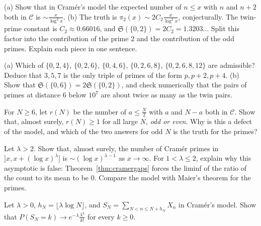 \begin{exercise}[$\star$]\label{ex:modeltwins}
(a) Show that in Cramér's model the expected number of $n\le x$ with $n$ and $n+2$ both in $\mathcal C$ is $\sim\frac x{\log^2x}$.
(b) The truth is $\pi_2(x)\sim2C_2\frac x{\log^2x}$, conjecturally. The twin-prime constant is $C_2\approx0.66016$, and $\mathfrak S(\{0,2\})=2C_2=1.3203\ldots$ Split this factor into the contribution of the prime $2$ and the contribution of the odd primes. Explain each piece in one sentence.
\end{exercise}

\begin{exercise}[$\star$]\label{ex:admissible}
(a) Which of $\{0,2,4\}$, $\{0,2,6\}$, $\{0,4,6\}$, $\{0,2,6,8\}$, $\{0,2,6,8,12\}$ are admissible? Deduce that $3,5,7$ is the only triple of primes of the form $p,p+2,p+4$.
(b) Show that $\mathfrak S(\{0,6\})=2\mathfrak S(\{0,2\})$, and check numerically that the pairs of primes at distance $6$ below $10^7$ are about twice as many as the twin pairs.
\end{exercise}

\begin{exercise}[$\star\star$]\label{ex:modelgoldbach}
For $N\ge6$, let $r(N)$ be the number of $a\le\frac N2$ with $a$ and $N-a$ both in $\mathcal C$. Show that, almost surely, $r(N)\ge1$ for all large $N$, \emph{odd or even}. Why is this a defect of the model, and which
of the two answers for odd $N$ is the truth for the primes?
\end{exercise}

\begin{exercise}[$\star\star$]\label{ex:shortmodel}
Let $\lambda>2$. Show that, almost surely, the number of Cramér primes in $]x,x+(\log x)^\lambda]$ is $\sim(\log x)^{\lambda-1}$ as $x\to\infty$. For $1<\lambda\le 2$, explain why this asymptotic is false: Theorem~\ref{thm:cramergaps} forces the liminf of the ratio of the count to its mean to be $0$. Compare the model with Maier's theorem for the primes.
\end{exercise}

\begin{exercise}[$\star\star$]\label{ex:modelpoisson}
Let $\lambda>0$, $h_N=\lfloor\lambda\log N\rfloor$, and $S_N=\sum_{N<n\le N+h_N}X_n$ in Cramér's model. Show that $P(S_N=k)\to e^{-\lambda}\frac{\lambda^k}{k!}$ for every $k\ge0$.
\end{exercise}

